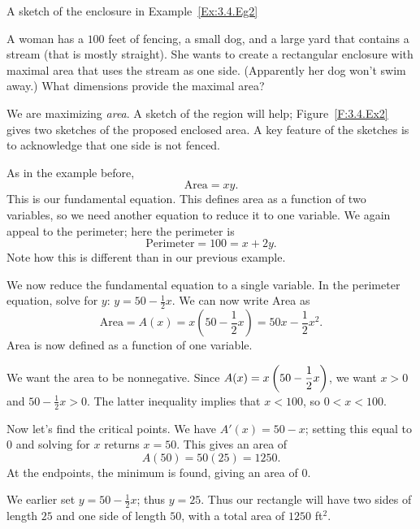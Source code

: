 \begin{marginfigure}[6cm]
\caption{A sketch of the enclosure in Example~\ref{Ex:3.4.Eg2} } \label{F:3.4.Ex2}
\end{marginfigure}

\begin{example} \label{Ex:3.4.Eg2}
A woman has a $100$ feet of fencing, a small dog, and a large yard that contains a stream (that is mostly straight). She wants to create a rectangular enclosure with maximal area that uses the stream as one side. (Apparently her dog won't swim away.) What dimensions provide the maximal area?

\solution We are maximizing \textit{area}. A sketch of the region will help; Figure~\ref{F:3.4.Ex2} gives two sketches of the proposed enclosed area. A key feature of the sketches is to acknowledge that one side is not fenced. 

As in the example before, $$\text{Area} = xy.$$ This is our fundamental equation. This defines area as a function of two variables, so we need another equation to  reduce it to one variable.  We again appeal to the perimeter; here the perimeter is $$\text{Perimeter} = 100 = x+2y.$$ Note how this is different than in our previous example.

We now reduce the fundamental equation to a single variable. In the perimeter equation, solve for $y$: $y = 50 - \frac{1}{2}x$. We can now write Area as 
$$\text{Area} = A(x) = x \left( 50- \frac{1}{2}x \right) = 50x - \frac{1}{2}x^2.$$ Area is now defined as a function of one variable.
	
We want the area to be nonnegative. Since $\displaystyle A(x) = x \left( 50- \frac{1}{2}x \right)$, we want $x > 0$ and $50- \frac{1}{2}x > 0$. The latter inequality implies that $x < 100$, so $0 < x < 100$. 
	
Now let's find the critical points. We have $A'(x) = 50-x$; setting this equal to $0$ and solving for $x$ returns $x=50$. This gives an area of $$A(50) = 50(25) = 1250.$$  At the endpoints, the minimum is found, giving an area of $0$.
	
We earlier set $y = 50- \frac{1}{2}x$; thus $y = 25$. Thus our rectangle will have two sides of length $25$ and one side of length $50$, with a total area of $1250$ ft$^2$.
\end{example}